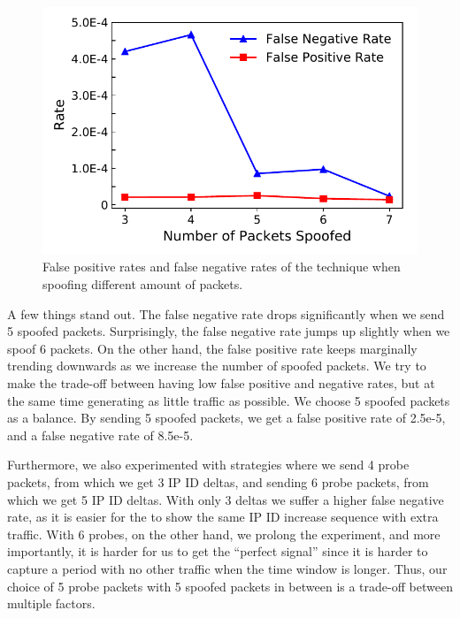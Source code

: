 \begin{figure}[t]
\centering
\includegraphics[width=0.85\columnwidth]{data_usage/images/false_positive_negative.pdf}
\caption{False positive rates and false negative rates of the technique when spoofing different amount of packets.}
\label{fig:fp_fn_analysis}
\end{figure}

A few things stand out. The false negative rate drops significantly when we
send 5 spoofed packets. Surprisingly, the false negative rate jumps up
slightly when we spoof 6 packets. On the other hand, the false positive rate
keeps marginally trending downwards as we increase the number of spoofed
packets. We try to make the trade-off between having low false positive and
negative rates, but at the same time generating as little traffic as possible.
We choose 5 spoofed packets as a balance. By sending 5 spoofed packets, we
get a false positive rate of 2.5e-5, and a false negative rate of 8.5e-5.

Furthermore, we also experimented with strategies where we send 4 probe packets, from which
we get 3 IP ID deltas, and sending 6 probe packets, from which we get 5 IP ID
deltas. With only 3 deltas we suffer a higher false negative rate, as it is
easier for the {} to show the same IP ID increase sequence with
extra traffic. With 6 probes, on the other hand, we prolong the experiment,
and more importantly, it is harder for us to get the ``perfect signal'' since
it is harder to capture a period with no other traffic when the time window
is longer. Thus, our choice of 5 probe packets with 5 spoofed packets in
between is a trade-off between multiple factors.

